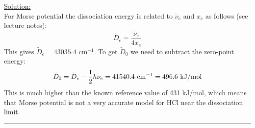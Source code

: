 \noindent
\underline{Solution:}\\

\noindent
For Morse potential the dissociation energy is related to $\tilde{\nu}_e$ and $x_e$ as follows (see lecture notes):
$$\tilde{D}_e = \frac{\tilde{\nu}_e}{4x_e}$$
This gives $\tilde{D}_e = 43035.4$ cm$^{-1}$. To get $\tilde{D}_0$ we need to subtract the zero-point energy:
$$\tilde{D}_0 = \tilde{D}_e - \frac{1}{2}h\nu_e = 41540.4\textnormal{ cm}^{-1} = 496.6\textnormal{ kJ/mol}$$
This is much higher than the known reference value of 431 kJ/mol, which means that Morse potential is not a very accurate model for HCl near the dissociation limit.

\hrule\vspace{0.5cm}




